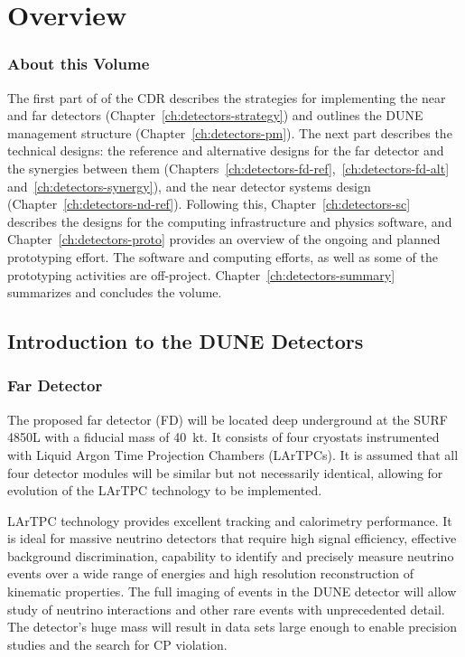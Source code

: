 \chapter{Overview}
\label{ch:detectors-overview}




\subsection{About this Volume}

The first part of \voldune{} of the CDR describes the strategies for
implementing the near and far detectors
(Chapter~\ref{ch:detectors-strategy}) and outlines the DUNE management
structure (Chapter~\ref{ch:detectors-pm}). The next part describes the
technical designs: the reference and alternative designs for the far
detector and the synergies between them
(Chapters~\ref{ch:detectors-fd-ref},~\ref{ch:detectors-fd-alt}
and~\ref{ch:detectors-synergy}), and the near detector systems design
(Chapter~\ref{ch:detectors-nd-ref}).  Following this,
Chapter~\ref{ch:detectors-sc} describes the designs for the computing
infrastructure and physics software, and
Chapter~\ref{ch:detectors-proto} provides an overview of the ongoing
and planned prototyping effort.  The software and computing efforts,
as well as some of the prototyping activities are
off-project. Chapter~\ref{ch:detectors-summary} summarizes and
concludes the volume.
 
\section{Introduction to the DUNE Detectors}
\label{sec:intro-dune-det}

\subsection{Far Detector}
\label{sec:intro-dune-far-det}

The proposed far detector (FD) will be located deep underground at the
SURF 4850L with a fiducial mass of 40~kt. It consists of four
cryostats instrumented with Liquid Argon Time Projection Chambers
(LArTPCs).  It is assumed that all four detector modules will be
similar but not necessarily identical, allowing for evolution of the
LArTPC technology to be implemented.

LArTPC technology provides excellent tracking and calorimetry
performance. It is ideal for massive neutrino detectors that require
high signal efficiency, effective background discrimination,
capability to identify and precisely measure neutrino events over a
wide range of energies and high resolution reconstruction of kinematic
properties. The full imaging of events in the DUNE detector will allow
study of neutrino interactions and other rare events with
unprecedented detail. The detector's huge mass will result in data
sets large enough to enable precision studies and the search for CP
violation.

